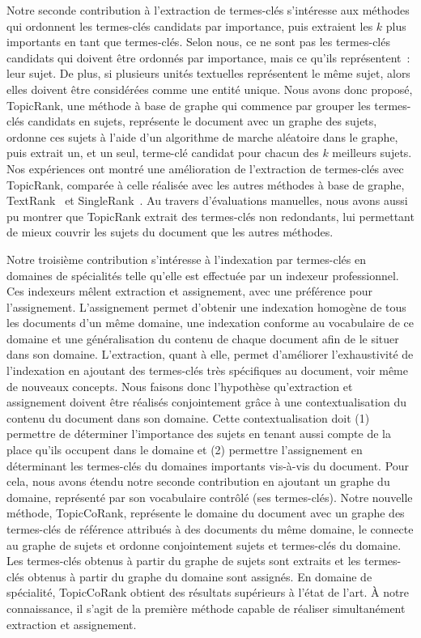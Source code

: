     Notre seconde contribution à l'extraction de termes-clés s'intéresse aux
    méthodes qui ordonnent les termes-clés candidats par importance, puis
    extraient les $k$ plus importants en tant que termes-clés. Selon nous, ce ne
    sont pas les termes-clés candidats qui doivent être ordonnés par importance,
    mais ce qu'ils représentent~: leur sujet. De plus, si plusieurs unités
    textuelles représentent le même sujet, alors elles doivent être considérées
    comme une entité unique. Nous avons donc proposé, TopicRank, une méthode à
    base de graphe qui commence par grouper les termes-clés candidats en sujets,
    représente le document avec un graphe des sujets, ordonne ces sujets à
    l'aide d'un algorithme de marche aléatoire dans le graphe, puis extrait un,
    et un seul, terme-clé candidat pour chacun des $k$ meilleurs sujets. Nos
    expériences ont montré une amélioration de l'extraction de termes-clés
    avec TopicRank, comparée à celle réalisée avec les autres méthodes à base de
    graphe, TextRank~\cite{mihalcea2004textrank} et
    SingleRank~\cite{wan2008expandrank}. Au
    travers d'évaluations manuelles, nous avons aussi pu montrer que TopicRank
    extrait des termes-clés non redondants, lui permettant de mieux couvrir les
    sujets du document que les autres méthodes.

    Notre troisième contribution s'intéresse à l'indexation par termes-clés en
    domaines de spécialités telle qu'elle est effectuée par un indexeur
    professionnel. Ces indexeurs mêlent extraction et assignement, avec une
    préférence pour l'assignement. L'assignement permet d'obtenir une indexation
    homogène de tous les documents d'un même domaine, une indexation conforme au
    vocabulaire de ce domaine et une généralisation du contenu de chaque
    document afin de le situer dans son domaine. L'extraction, quant à elle,
    permet d'améliorer l'exhaustivité de l'indexation en ajoutant des
    termes-clés très spécifiques au document, voir même de nouveaux concepts.
    Nous faisons donc l'hypothèse qu'extraction et assignement doivent être
    réalisés conjointement grâce à une contextualisation du contenu du
    document dans son domaine. Cette contextualisation doit (1) permettre de
    déterminer l'importance des sujets en tenant aussi compte de la place qu'ils
    occupent dans le domaine et (2) permettre l'assignement en déterminant les
    termes-clés du domaines importants vis-à-vis du document.
    Pour cela, nous avons étendu notre seconde contribution en ajoutant un
    graphe du domaine, représenté par son vocabulaire contrôlé (ses
    termes-clés). Notre nouvelle méthode, TopicCoRank, représente le domaine du
    document avec un graphe des termes-clés de référence attribués à des
    documents du même domaine, le connecte au graphe de sujets et ordonne
    conjointement sujets et termes-clés du domaine. Les termes-clés obtenus à
    partir du graphe de sujets sont extraits et les termes-clés obtenus à partir
    du graphe du domaine sont assignés. En domaine de spécialité, TopicCoRank
    obtient des résultats supérieurs à l'état de l'art. À notre connaissance, il
    s'agit de la première méthode capable de réaliser simultanément
    extraction et assignement.

